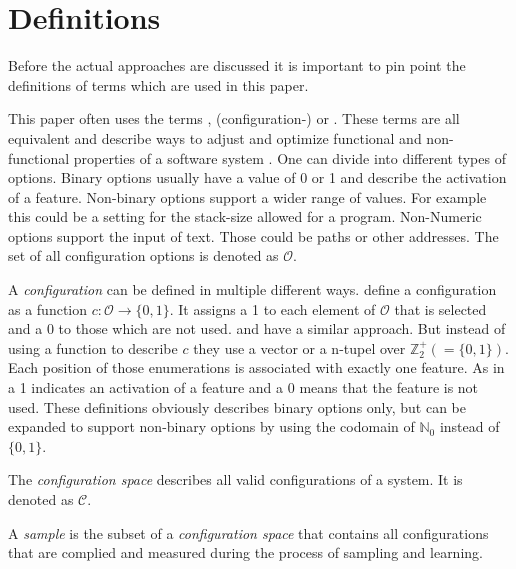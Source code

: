 \section{Definitions}

Before the actual approaches are discussed it is important to pin point the definitions of terms which are used in this paper.

This paper often uses the terms , (configuration-) or . These terms are all equivalent and describe ways to adjust and optimize functional and non-functional properties of a software system \cite{DistanceBasedSampling2019}.
One can divide into different types of options. Binary options usually have a value of 0 or 1 and describe the activation of a feature. Non-binary options support a wider range of values. For example this could be a setting for the stack-size allowed for a program. Non-Numeric options support the input of text. Those could be paths or other addresses.
The set of all configuration options is denoted as $\mathcal{O}$.


A \textit{configuration} can be defined in multiple different ways. \citet{DistanceBasedSampling2019} define a configuration as a function $c : \mathcal{O} \rightarrow \{0,1\}$. It assigns a 1 to each element of $\mathcal{O}$ that is selected and a 0 to those which are not used.
\citet{FasterDiscoveryofFasterSystemConfigurationsSiegmund2017} and \cite{VariabilityAwarePerformancePredictionJianmeiSigmundApel} have a similar approach. But instead of using a function to describe $c$ they use a vector or a n-tupel over $\mathbb{Z}^+_2(= \{0,1\})$. Each position of those enumerations is associated with exactly one feature. As in \cite{DistanceBasedSampling2019} a 1 indicates an activation of a feature and a 0 means that the feature is not used. These definitions obviously describes binary options only, but can be expanded to support non-binary options by using the codomain of $\mathbb{N}_0$ instead of $\{0,1\}$.  


The \textit{configuration space} describes all valid configurations of a system. It is denoted as $\mathcal{C}$.

A \textit{sample} is the subset of a \textit{configuration space} that contains all configurations that are complied and measured during the process of sampling and learning.

